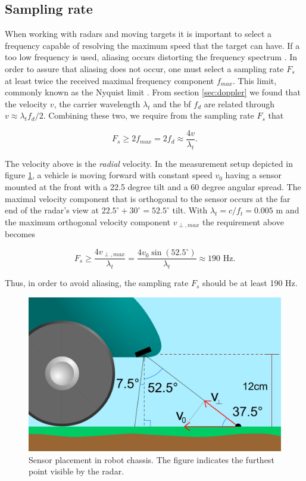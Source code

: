 \subsection{Sampling rate}
When working with radars and moving targets it is important to select a frequency capable of resolving the maximum speed that the target can have. If a too low frequency is used, aliasing occurs distorting the frequency spectrum \citep{lindgren_rootzeŽn_sandsten_2013}. In order to assure that aliasing does not occur, one must select a sampling rate $F_s$ at least twice the received maximal frequency component $f_{max}$. This limit, commonly known as the Nyquist limit \citep{proakis_manolakis_1995}. From section \ref{sec:doppler} we found that the velocity $v$, the carrier wavelength $\lambda_t$ and the \gls{bf} $f_d$ are related through $v \approx \lambda_tf_d/2$. Combining these two, we require from the sampling rate $F_s$ that 

\begin{equation}
\label{eq:nyquist}
		F_{s} \geq 2f_{max} 
		= 2f_d 
		\approx \frac{4v}{\lambda_t}.
\end{equation}

The velocity above is the \emph{radial} velocity. In the measurement setup depicted in figure \ref{fig:sensor_placement}, a vehicle is moving forward with constant speed $v_0$ having a sensor mounted at the front with a 22.5 degree tilt and a 60 degree angular spread. The maximal velocity component that is orthogonal to the sensor occurs at the far end of the radar's view at $22.5^\circ + 30^\circ = 52.5^\circ$ tilt. With $\lambda_t=c/f_t=0.005$ m and the maximum orthogonal velocity component $v_{\perp, max}$ the requirement above becomes

\begin{equation}
	F_s \geq 
	\frac{4v_{\perp, max}}{\lambda_t}
	= \frac{4v_0\sin(52.5^\circ)}{\lambda_t} 
	\approx 190 \text{ Hz}.
\end{equation}

Thus, in order to avoid aliasing, the sampling rate $F_s$ should be at least 190 Hz. 


\begin{figure}[h]
	\centering
	\includegraphics[scale=0.30]{figs_temp/sensor_placement.jpg}
	\caption{Sensor placement in robot chassis. The figure indicates the furthest point visible by the radar.}
	\label{fig:sensor_placement}
\end{figure}
